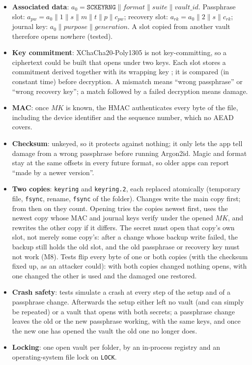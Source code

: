\documentclass[11pt,a4paper]{article}
\newcommand{\concat}{\mathbin{\|}}
\begin{document}
\begin{itemize}
  \item \textbf{Associated data}: $a_0 = \texttt{SCKEYRNG} \concat \mathit{format} \concat \mathit{suite} \concat \mathit{vault\_id}$. Passphrase slot: $a_{pw} = a_0 \concat 1 \concat s \concat m \concat t \concat p \concat c_{pw}$; recovery slot: $a_{rk} = a_0 \concat 2 \concat s \concat c_{rk}$; journal key: $a_0 \concat \mathit{purpose} \concat \mathit{generation}$. A slot copied from another vault therefore opens nowhere (tested).
  \item \textbf{Key commitment}: XChaCha20-Poly1305 is not key-committing, so a ciphertext could be built that opens under two keys. Each slot stores a commitment derived together with its wrapping key \cite{albertini}; it is compared (in constant time) before decryption. A mismatch means ``wrong passphrase'' or ``wrong recovery key''; a match followed by a failed decryption means damage.
  \item \textbf{MAC}: once $MK$ is known, the HMAC authenticates every byte of the file, including the device identifier and the sequence number, which no AEAD covers.
  \item \textbf{Checksum}: unkeyed, so it protects against nothing; it only lets the app tell damage from a wrong passphrase before running Argon2id. Magic and format stay at the same offsets in every future format, so older apps can report ``made by a newer version''.
  \item \textbf{Two copies}: \texttt{keyring} and \texttt{keyring.2}, each replaced atomically (temporary file, \texttt{fsync}, rename, \texttt{fsync} of the folder). Changes write the main copy first; from then on they count. Opening tries the copies newest first, uses the newest copy whose MAC and journal keys verify under the opened $MK$, and rewrites the other copy if it differs. The secret must open that copy's own slot, not merely some copy's: after a change whose backup write failed, the backup still holds the old slot, and the old passphrase or recovery key must not work (M8). Tests flip every byte of one or both copies (with the checksum fixed up, as an attacker could): with both copies changed nothing opens, with one changed the other is used and the damaged one restored.
  \item \textbf{Crash safety}: tests simulate a crash at every step of the setup and of a passphrase change. Afterwards the setup either left no vault (and can simply be repeated) or a vault that opens with both secrets; a passphrase change leaves the old or the new passphrase working, with the same keys, and once the new one has opened the vault the old one no longer does.
  \item \textbf{Locking}: one open vault per folder, by an in-process registry and an operating-system file lock on \texttt{LOCK}.
\end{itemize}
\end{document}
